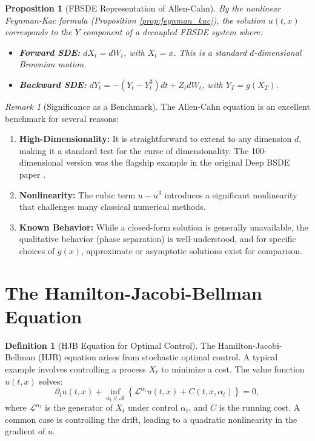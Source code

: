 \documentclass[11pt,letterpaper,oneside]{article}
\theoremstyle{plain}
\newtheorem{proposition}[theorem]{Proposition}
\theoremstyle{definition}
\newtheorem{definition}[theorem]{Definition}
\theoremstyle{remark}
\newtheorem{remark}{Remark}[section]
\begin{document}
\begin{proposition}[FBSDE Representation of Allen-Cahn]
By the nonlinear Feynman-Kac formula (Proposition \ref{prop:feynman_kac}), the solution \(u(t,x)\) corresponds to the \(Y\) component of a decoupled FBSDE system where:
\begin{itemize}
    \item \textbf{Forward SDE:} \(dX_t = dW_t\), with \(X_t=x\). This is a standard \(d\)-dimensional Brownian motion.
    \item \textbf{Backward SDE:} \(dY_t = -(Y_t - Y_t^3)dt + Z_t dW_t\), with \(Y_T = g(X_T)\).
\end{itemize}
\end{proposition}

\begin{remark}[Significance as a Benchmark]
The Allen-Cahn equation is an excellent benchmark for several reasons:
\begin{enumerate}
    \item \textbf{High-Dimensionality:} It is straightforward to extend to any dimension \(d\), making it a standard test for the curse of dimensionality. The 100-dimensional version was the flagship example in the original Deep BSDE paper \cite{EHanJentzen2017}.
    \item \textbf{Nonlinearity:} The cubic term \(u-u^3\) introduces a significant nonlinearity that challenges many classical numerical methods.
    \item \textbf{Known Behavior:} While a closed-form solution is generally unavailable, the qualitative behavior (phase separation) is well-understood, and for specific choices of \(g(x)\), approximate or asymptotic solutions exist for comparison.
\end{enumerate}
\end{remark}

\section{The Hamilton-Jacobi-Bellman Equation}
\label{sec:hjb}

\begin{definition}[HJB Equation for Optimal Control]
The Hamilton-Jacobi-Bellman (HJB) equation arises from stochastic optimal control. A typical example involves controlling a process \(X_t\) to minimize a cost. The value function \(u(t,x)\) solves:
\begin{equation}
    \partial_t u(t,x) + \inf_{\alpha_t \in \mathcal{A}} \left\{ \mathcal{L}^{\alpha_t} u(t,x) + C(t,x,\alpha_t) \right\} = 0,
\end{equation}
where \(\mathcal{L}^{\alpha_t}\) is the generator of \(X_t\) under control \(\alpha_t\), and \(C\) is the running cost. A common case is controlling the drift, leading to a quadratic nonlinearity in the gradient of \(u\).
\end{definition}
\end{document}
